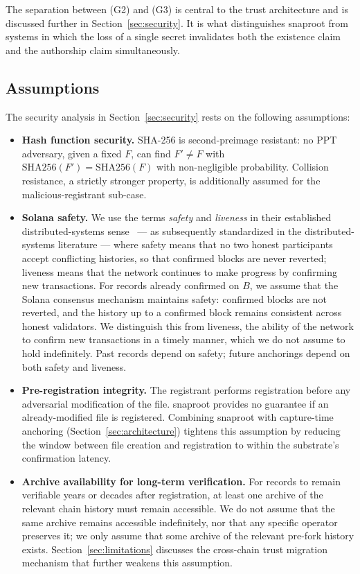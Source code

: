 \documentclass[11pt,a4paper]{article}
\begin{document}
The separation between (G2) and (G3) is central to the trust
architecture and is discussed further in Section~\ref{sec:security}.
It is what distinguishes snaproot from systems in which the loss of a
single secret invalidates both the existence claim and the authorship
claim simultaneously.

\subsection{Assumptions}
\label{sec:threat:assumptions}

The security analysis in Section~\ref{sec:security} rests on the
following assumptions:

\begin{itemize}
\item \textbf{Hash function security.} SHA-256 is second-preimage
resistant: no PPT adversary, given a fixed $F$, can find $F' \neq F$
with $\mathrm{SHA256}(F') = \mathrm{SHA256}(F)$ with non-negligible
probability. Collision resistance, a strictly stronger property, is
additionally assumed for the malicious-registrant sub-case.

\item \textbf{Solana safety.} We use the terms \emph{safety} and
\emph{liveness} in their established distributed-systems
sense~\cite{lamport1977multiprocess} --- as subsequently standardized
in the distributed-systems literature --- where safety means that no
two honest participants accept conflicting histories, so that confirmed
blocks are never reverted; liveness means that the network continues
to make progress by confirming new transactions. For
records already confirmed on $B$, we assume that the Solana consensus
mechanism maintains safety: confirmed blocks are not reverted, and the
history up to a confirmed block remains consistent across honest
validators. We distinguish this from liveness, the ability of the
network to confirm new transactions in a timely manner, which we do
not assume to hold indefinitely. Past records depend on safety; future
anchorings depend on both safety and liveness.

\item \textbf{Pre-registration integrity.} The registrant performs
registration before any adversarial modification of the file. snaproot
provides no guarantee if an already-modified file is registered.
Combining snaproot with capture-time anchoring
(Section~\ref{sec:architecture}) tightens this assumption by reducing
the window between file creation and registration to within the
substrate's confirmation latency.

\item \textbf{Archive availability for long-term verification.} For
records to remain verifiable years or decades after registration, at
least one archive of the relevant chain history must remain accessible.
We do not assume that the same archive remains accessible indefinitely,
nor that any specific operator preserves it; we only assume that some
archive of the relevant pre-fork history exists. Section~\ref{sec:limitations}
discusses the cross-chain trust migration mechanism that further weakens
this assumption.
\end{itemize}
\end{document}
